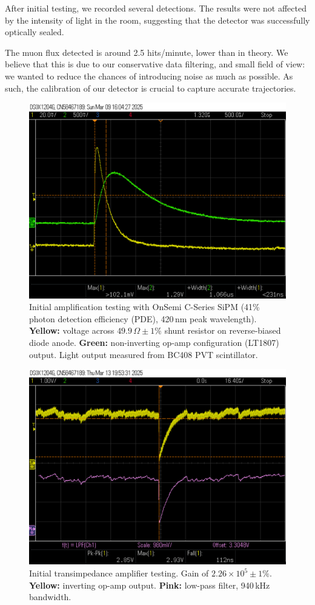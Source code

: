 After initial testing, we recorded several detections. The results were not affected by the intensity of light in the room, suggesting that the detector was successfully optically sealed.

The muon flux detected is around 2.5 hits/minute, lower than in theory. We believe that this is due to our conservative data filtering, and small field of view: we wanted to reduce the chances of introducing noise as much as possible. As such, the calibration of our detector is crucial to capture accurate trajectories.


\begin{figure} [h]
    \centering
    \includegraphics[width=0.58\linewidth]{figures/scope_yellow_green.png}
    \caption{Initial amplification testing with OnSemi C-Series SiPM (41\% photon detection efficiency (PDE), 420\,nm peak wavelength). \textbf{Yellow:} voltage across $49.9\,\Omega \pm 1\%$ shunt resistor on reverse-biased diode anode. \textbf{Green:} non-inverting op-amp configuration (LT1807) output. Light output measured from BC408 PVT scintillator.
}
    \label{fig3}
\end{figure}



\begin{figure} [h]
    \centering
    \includegraphics[width=0.58\linewidth]{figures/scope_yellow_purple.png}
    \caption{Initial transimpedance amplifier testing. Gain of $2.26 \times 10^5 \pm 1\%$. \textbf{Yellow:} inverting op-amp output. \textbf{Pink:} low-pass filter, 940\,kHz bandwidth.}
    \label{fig4}
\end{figure}

